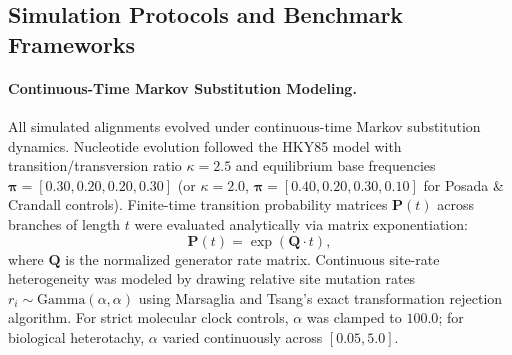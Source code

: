 \subsection{Simulation Protocols and Benchmark Frameworks}
\label{subsec:methods_simulations}

\paragraph{Continuous-Time Markov Substitution Modeling.}
All simulated alignments evolved under continuous-time Markov substitution dynamics. Nucleotide evolution followed the HKY85 model with transition/transversion ratio $\kappa = 2.5$ and equilibrium base frequencies $\bm{\pi} = [0.30, 0.20, 0.20, 0.30]$ (or $\kappa = 2.0$, $\bm{\pi} = [0.40, 0.20, 0.30, 0.10]$ for Posada \& Crandall controls). Finite-time transition probability matrices $\mathbf{P}(t)$ across branches of length $t$ were evaluated analytically via matrix exponentiation:
\begin{equation}
\mathbf{P}(t) = \exp(\mathbf{Q} \cdot t),
\end{equation}
where $\mathbf{Q}$ is the normalized generator rate matrix. Continuous site-rate heterogeneity was modeled by drawing relative site mutation rates $r_i \sim \text{Gamma}(\alpha, \alpha)$ using Marsaglia and Tsang's exact transformation rejection algorithm. For strict molecular clock controls, $\alpha$ was clamped to $100.0$; for biological heterotachy, $\alpha$ varied continuously across $[0.05, 5.0]$.

